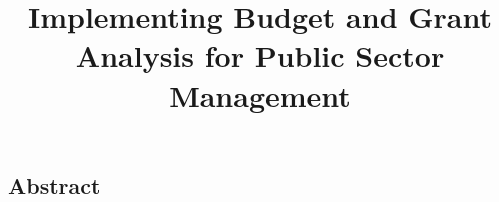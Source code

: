 \documentclass[12pt,oneside,a4paper]{book} %
\title{Implementing Budget and Grant Analysis for Public Sector Management}
\begin{document}
	\maketitle
	\newpage
	\begin{spacing}{1.5}
		
		\newpage
		
		\newpage
		
		\newpage
		\chapter*{Abstract}
		
	\end{spacing}
	\newpage
	\pagestyle{fplain}
	\begin{spacing}{1.5}
		\tableofcontents
	\end{spacing}
	\newpage
	\begin{spacing}{1.5}
		\cleardoublepage
		\listoffigures
	\end{spacing}
	\newpage
	\begin{spacing}{1.5}
		\cleardoublepage
		\listoftables
	\end{spacing}
	\newpage

	\newpage
	\printglossary[type=\acronymtype, title= Abbreviations, toctitle=Abbreviations]


	\mainmatter
	\pagestyle{mplain}
	\glsresetall
	\begin{spacing}{1.5}
		

		




		
		\backmatter
		\clearpage
		\printbibliography%
	\end{spacing}
\end{document}
